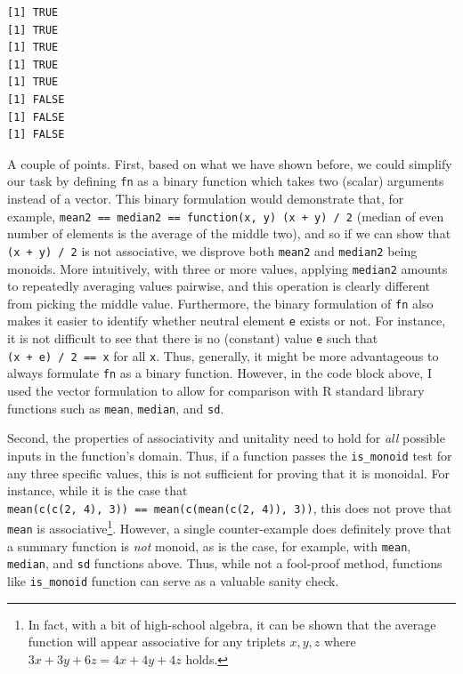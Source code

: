 \documentclass[
  openany]{book}
\theoremstyle{definition}
\theoremstyle{definition}
\theoremstyle{definition}
\theoremstyle{definition}
\theoremstyle{remark}
\begin{document}
\begin{verbatim}
[1] TRUE
[1] TRUE
[1] TRUE
[1] TRUE
[1] TRUE
[1] FALSE
[1] FALSE
[1] FALSE
\end{verbatim}

A couple of points. First, based on what we have shown before, we could simplify our task by defining \texttt{fn} as a binary function which takes two (scalar) arguments instead of a vector. This binary formulation would demonstrate that, for example, \texttt{mean2\ ==\ median2\ ==\ function(x,\ y)\ (x\ +\ y)\ /\ 2} (median of even number of elements is the average of the middle two), and so if we can show that \texttt{(x\ +\ y)\ /\ 2} is not associative, we disprove both \texttt{mean2} and \texttt{median2} being monoids. More intuitively, with three or more values, applying \texttt{median2} amounts to repeatedly averaging values pairwise, and this operation is clearly different from picking the middle value. Furthermore, the binary formulation of \texttt{fn} also makes it easier to identify whether neutral element \texttt{e} exists or not. For instance, it is not difficult to see that there is no (constant) value \texttt{e} such that \texttt{(x\ +\ e)\ /\ 2\ ==\ x} for all \texttt{x}. Thus, generally, it might be more advantageous to always formulate \texttt{fn} as a binary function. However, in the code block above, I used the vector formulation to allow for comparison with R standard library functions such as \texttt{mean}, \texttt{median}, and \texttt{sd}.

Second, the properties of associativity and unitality need to hold for \emph{all} possible inputs in the function's domain. Thus, if a function passes the \texttt{is\_monoid} test for any three specific values, this is not sufficient for proving that it is monoidal. For instance, while it is the case that \texttt{mean(c(c(2,\ 4),\ 3))\ ==\ mean(c(mean(c(2,\ 4)),\ 3))}, this does not prove that \texttt{mean} is associative\footnote{In fact, with a bit of high-school algebra, it can be shown that the average function will appear associative for any triplets \(x, y, z\) where \(3x + 3y + 6z = 4x + 4y + 4z\) holds.}. However, a single counter-example does definitely prove that a summary function is \emph{not} monoid, as is the case, for example, with \texttt{mean}, \texttt{median}, and \texttt{sd} functions above. Thus, while not a fool-proof method, functions like \texttt{is\_monoid} function can serve as a valuable sanity check.
\end{document}
